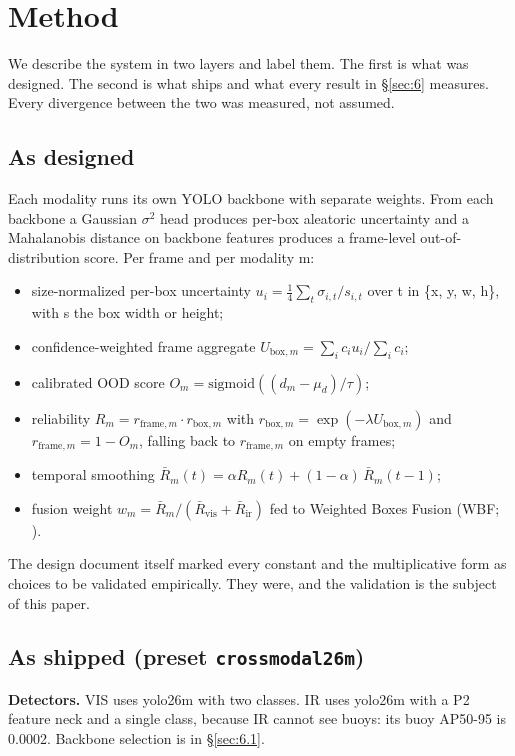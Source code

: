 \documentclass[10pt]{article}
\begin{document}
\section{Method}\label{sec:4}
We describe the system in two layers and label them. The first is what was designed. The second is what ships and what every result in \S\ref{sec:6} measures. Every divergence between the two was measured, not assumed.

\subsection{As designed}\label{sec:4.1}
Each modality runs its own YOLO backbone with separate weights. From each backbone a Gaussian $\sigma$$^{2}$ head produces per-box aleatoric uncertainty and a Mahalanobis distance on backbone features produces a frame-level out-of-distribution score. Per frame and per modality m:

\begin{itemize}
\item size-normalized per-box uncertainty $u_i = \frac{1}{4}\sum_t \sigma_{i,t}/s_{i,t}$ over t in \{x, y, w, h\}, with s the box width or height;
\item confidence-weighted frame aggregate $U_{\mathrm{box},m} = \sum_i c_i u_i / \sum_i c_i$;
\item calibrated OOD score $O_m = \mathrm{sigmoid}((d_m - \mu_d)/\tau)$;
\item reliability $R_m = r_{\mathrm{frame},m} \cdot r_{\mathrm{box},m}$ with $r_{\mathrm{box},m} = \exp(-\lambda U_{\mathrm{box},m})$ and $r_{\mathrm{frame},m} = 1 - O_m$, falling back to $r_{\mathrm{frame},m}$ on empty frames;
\item temporal smoothing $\bar{R}_m(t) = \alpha R_m(t) + (1 - \alpha)\,\bar{R}_m(t-1)$;
\item fusion weight $w_m = \bar{R}_m / (\bar{R}_{\mathrm{vis}} + \bar{R}_{\mathrm{ir}})$ fed to Weighted Boxes Fusion (WBF; \citealp{solovyev2021weighted}).
\end{itemize}

The design document itself marked every constant and the multiplicative form as choices to be validated empirically. They were, and the validation is the subject of this paper.

\subsection{As shipped (preset \texttt{crossmodal26m})}\label{sec:4.2}
\textbf{Detectors.} VIS uses yolo26m \citep{jocher2026ultralytics} with two classes. IR uses yolo26m with a P2 feature neck and a single class, because IR cannot see buoys: its buoy AP50-95 is 0.0002. Backbone selection is in \S\ref{sec:6.1}.
\end{document}
